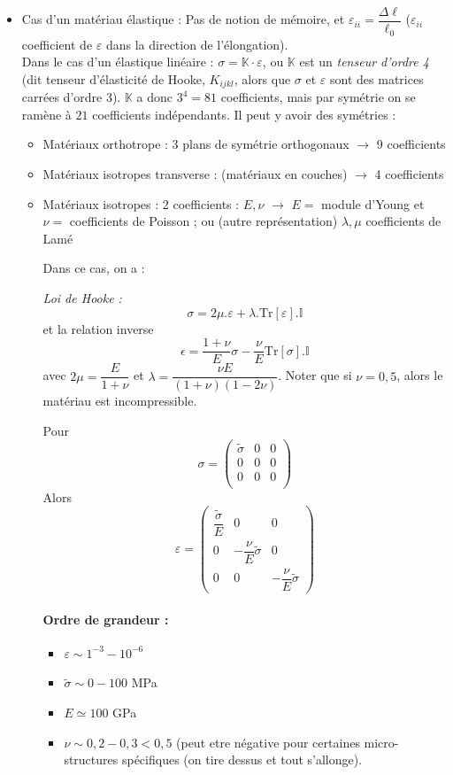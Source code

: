\documentclass{article}
\begin{document}
\begin{itemize}
\item Cas d'un matériau élastique : Pas de notion de mémoire, et $\varepsilon_{ii} = \dfrac{\Delta \ell}{\ell_0}$ ($\varepsilon_{ii}$ coefficient de $\varepsilon$ dans la direction de l'élongation).\\
Dans le cas d'un élastique linéaire : $\sigma = \mathbb{K}\cdot\varepsilon$, ou $\mathbb{K}$ est un \emph{tenseur d'ordre 4} (dit tenseur d'élasticité de Hooke, $K_{ijkl}$, alors que $\sigma$ et $\varepsilon$ sont des matrices carrées d'ordre 3). $\mathbb{K}$ a donc $3^4=81$ coefficients, mais par symétrie on se ramène à $21$ coefficients indépendants. Il peut y avoir des symétries :
\begin{itemize}[label=\textbullet]
\item Matériaux orthotrope : 3 plans de symétrie orthogonaux $\to$ 9 coefficients
\item Matériaux isotropes transverse : (matériaux en couches) $\to$ 4 coefficients
\item Matériaux isotropes : 2 coefficients : $E,\nu$ $\to$ $E=$ module d'Young et $\nu=$ coefficients de Poisson ; ou (autre représentation) $\lambda,\mu$ coefficients de Lamé

Dans ce cas, on a :


\emph{Loi de Hooke :}
\[\sigma = 2\mu.\varepsilon + \lambda.\text{Tr}[\varepsilon].\mathbb{I}\]
et la relation inverse
\[\epsilon = \dfrac{1+\nu}{E}\sigma - \dfrac{\nu}{E}\text{Tr}[\sigma].\mathbb{I}\]
avec $2\mu = \dfrac{E}{1+\nu}$ et $\lambda = \dfrac{\nu E}{(1+\nu)(1-2\nu)}$. Noter que si $\nu = 0,5$, alors le matériau est incompressible.
\bigskip


Pour
\[
\sigma = \begin{pmatrix}
\tilde{\sigma} & 0 & 0\\
0 & 0 & 0\\
0 & 0 & 0\\
\end{pmatrix}
\]
Alors 
\[\varepsilon = 
\begin{pmatrix}
\dfrac{\tilde{\sigma}}{E} & 0 & 0\\
0 & -\dfrac{\nu}{E}\tilde{\sigma} & 0\\
0 & 0 & -\dfrac{\nu}{E}\tilde{\sigma}
\end{pmatrix}
\]
\paragraph{Ordre de grandeur :}
\begin{itemize}[label=$\star$]
\item $\varepsilon \sim 1^{-3}-10^{-6}$
\item $\tilde{\sigma}\sim 0-100$ MPa
\item $E \simeq 100$ GPa
\item $\nu \sim 0,2 - 0,3 < 0,5$ (peut etre négative pour certaines micro-structures spécifiques (on tire dessus et tout s'allonge).
\end{itemize}
\end{itemize}
\end{itemize}
\end{document}
